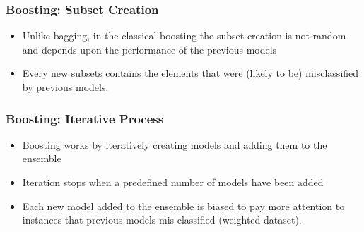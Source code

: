 

\begin{frame}[fragile]\frametitle{Boosting: Subset Creation}
\begin{itemize}
\item Unlike bagging, in the classical boosting the subset creation is not random and depends upon the performance of the previous models
\item Every new subsets contains the elements that were (likely to be) misclassified by previous models.
\end{itemize}
\end{frame}


\begin{frame}[fragile]\frametitle{Boosting: Iterative Process}
\begin{itemize}
\item Boosting works by iteratively creating models and adding them to the ensemble
\item Iteration stops when a predefined number of models have been added
\item Each new model added to the ensemble is biased to pay more attention to instances that previous models mis-classified (weighted dataset). 
\end{itemize}
\end{frame}
%

